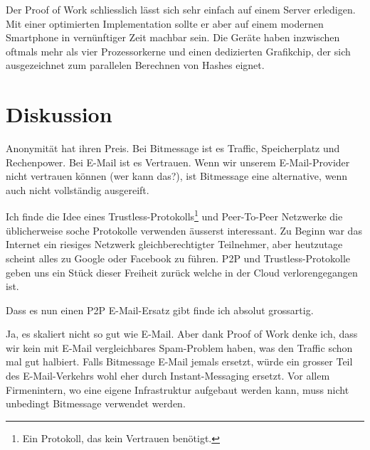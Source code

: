 \documentclass{bfh}
\begin{document}
  Der Proof of Work schliesslich lässt sich sehr einfach auf einem Server erledigen. Mit einer optimierten Implementation sollte er aber auf einem modernen Smartphone in vernünftiger Zeit machbar sein. Die Geräte haben inzwischen oftmals mehr als vier Prozessorkerne und einen dedizierten Grafikchip, der sich ausgezeichnet zum parallelen Berechnen von Hashes eignet.

  \newpage
  \section{Diskussion}

  Anonymität hat ihren Preis. Bei Bitmessage ist es Traffic, Speicherplatz und Rechenpower. Bei E-Mail ist es Vertrauen. Wenn wir unserem E-Mail-Provider nicht vertrauen können (wer kann das?), ist Bitmessage eine alternative, wenn auch nicht vollständig ausgereift.

  Ich finde die Idee eines Trustless-Protokolls\footnote{Ein Protokoll, das kein Vertrauen benötigt.} und Peer-To-Peer Netzwerke die üblicherweise soche Protokolle verwenden äusserst interessant. Zu Beginn war das Internet ein riesiges Netzwerk gleichberechtigter Teilnehmer, aber heutzutage scheint alles zu Google oder Facebook zu führen. P2P und Trustless-Protokolle geben uns ein Stück dieser Freiheit zurück welche in der Cloud verlorengegangen ist.

  Dass es nun einen P2P E-Mail-Ersatz gibt finde ich absolut grossartig.

  Ja, es skaliert nicht so gut wie E-Mail. Aber dank Proof of Work denke ich, dass wir kein mit E-Mail vergleichbares Spam-Problem haben, was den Traffic schon mal gut halbiert. Falls Bitmessage E-Mail jemals ersetzt, würde ein grosser Teil des E-Mail-Verkehrs wohl eher durch Instant-Messaging ersetzt. Vor allem Firmenintern, wo eine eigene Infrastruktur aufgebaut werden kann, muss nicht unbedingt Bitmessage verwendet werden.

  \newpage
  
  
  \listoffigures
\end{document}
